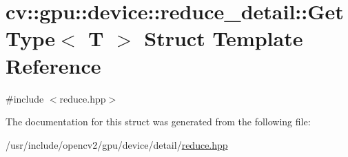 \hypertarget{structcv_1_1gpu_1_1device_1_1reduce__detail_1_1GetType}{\section{cv\-:\-:gpu\-:\-:device\-:\-:reduce\-\_\-detail\-:\-:Get\-Type$<$ T $>$ Struct Template Reference}
\label{structcv_1_1gpu_1_1device_1_1reduce__detail_1_1GetType}
}


{\ttfamily \#include $<$reduce.\-hpp$>$}



The documentation for this struct was generated from the following file\-:\begin{DoxyCompactItemize}
\item 
/usr/include/opencv2/gpu/device/detail/\hyperlink{detail_2reduce_8hpp}{reduce.\-hpp}\end{DoxyCompactItemize}
